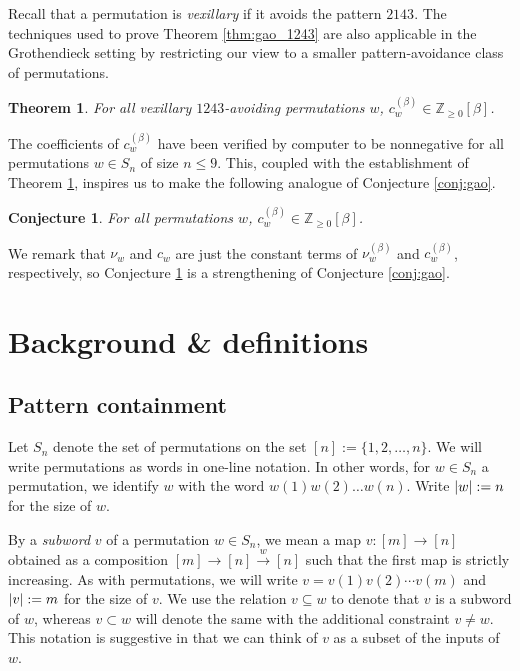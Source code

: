 \documentclass[11pt]{article}
\newtheorem{theorem}[theo]{Theorem}
\newtheorem{conjecture}[theo]{Conjecture}
\theoremstyle{definition}
\numberwithin{equation}{section}
\newcommand{\Z}{\mathbb{Z}}
\newcommand{\sseq}{\subseteq}
\DeclarePairedDelimiter\abs{\lvert}{\rvert}
\begin{document}
Recall that a permutation is \textit{vexillary} if it avoids the pattern $2143$.
The techniques used to prove Theorem \ref{thm:gao_1243} are also applicable in the Grothendieck setting by restricting our view to a smaller pattern-avoidance class of permutations.
\begin{theorem}
\label{thm:groth_gao_1243_2143}
    For all vexillary $1243$-avoiding permutations $w$,
    $c^{(\beta)}_w \in \Z_{\geq0}[\beta]$.
\end{theorem}

The coefficients of $c^{(\beta)}_w$ have been verified by computer to be nonnegative for all permutations $w\in S_n$ of size $n\leq 9$.
This, coupled with the establishment of Theorem \ref{thm:groth_gao_1243_2143},
inspires us to make the following analogue of Conjecture \ref{conj:gao}.
\begin{conjecture}
\label{conj:groth_gao}
    For all permutations $w$, $c^{(\beta)}_w \in \Z_{\geq0}[\beta]$.
\end{conjecture}
We remark that $\nu_w$ and $c_w$ are just the constant terms of $\nu^{(\beta)}_w$ and $c^{(\beta)}_w$, respectively, so Conjecture \ref{conj:groth_gao} is a strengthening of Conjecture \ref{conj:gao}.





\section{Background \& definitions}

\subsection{Pattern containment}
\label{sect:pat}

Let $S_n$ denote the set of permutations on the set $[n] := \{1,2,\dots,n\}$.
We will write permutations as words in one-line notation.
In other words, for $w\in S_n$ a permutation, we identify $w$ with the word $w(1)w(2)\dots w(n)$.
Write $\abs*{w} := n$ for the size of $w$.

By a \textit{subword} $v$ of a permutation $w\in S_n$, we mean a map $v\colon [m]\to [n]$ obtained as a composition $[m]\to [n]\overset w\to [n]$ such that the first map is strictly increasing.
As with permutations, we will write $v = v(1)v(2)\cdots v(m)$ and $\abs*{v} := m$ for the size of $v$.
We use the relation $v\sseq w$ to denote that $v$ is a subword of $w$, whereas $v\subset w$ will denote the same with the additional constraint $v\neq w$.
This notation is suggestive in that we can think of $v$ as a subset of the inputs of $w$.
\end{document}
